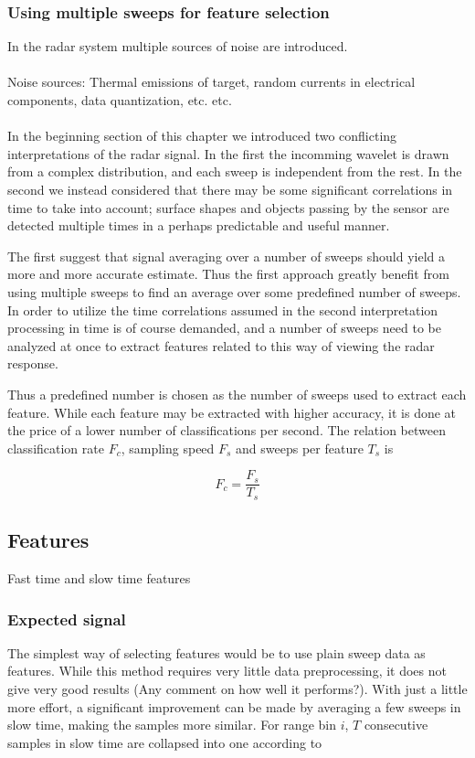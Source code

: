 \documentclass[a4paper, 12pt]{article}
\begin{document}
\subsubsection{Using multiple sweeps for feature selection}

In the radar system multiple sources of noise are introduced.
\\ \\
Noise sources: Thermal emissions of target, random currents in electrical components, data quantization, etc. etc. \citep{w_doerry_2016}
\\ \\
In the beginning section of this chapter we introduced two conflicting interpretations of the radar signal. In the first the incomming wavelet is drawn from a complex distribution, and each sweep is independent from the rest. In the second we instead considered that there may be some significant correlations in time to take into account; surface shapes and objects passing by the sensor are detected multiple times in a perhaps predictable and useful manner.  

The first suggest that signal averaging over a number of sweeps should yield a more and more accurate estimate. Thus the first approach greatly benefit from using multiple sweeps to find an average over some predefined number of sweeps.  In order to utilize the time correlations assumed in the second interpretation processing in time is of course demanded, and a number of sweeps need to be analyzed at once to extract features related to this way of viewing the radar response. 

Thus a predefined number is chosen as the number of sweeps used to extract each feature. While each feature may be extracted with higher accuracy, it is done at the price of a lower number of classifications per second. The relation between classification rate $F_c$, sampling speed $F_s$ and sweeps per feature $T_s$ is



\begin{equation}
	F_c = \frac{F_s}{T_s}
\end{equation}

\subsection{Features}

Fast time and slow time features 



\subsubsection{Expected signal}
The simplest way of selecting features would be to use plain sweep data as features. While this method requires very little data preprocessing, it does not give very good results (Any comment on how well it performs?). With just a little more effort, a significant improvement can be made by averaging a few sweeps in slow time, making the samples more similar. For range bin $i$, $T$ consecutive samples in slow time are collapsed into one according to
\end{document}
